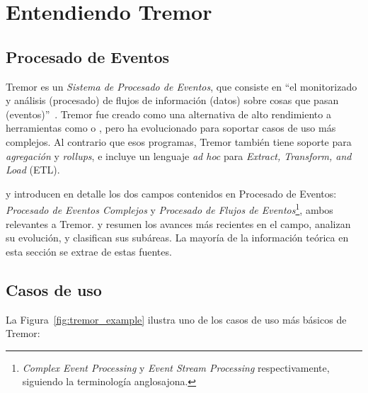 
\chapter{Entendiendo Tremor}\label{ch:tremor}

\section{Procesado de Eventos}

Tremor es un \emph{Sistema de Procesado de Eventos}, que consiste en ``el
monitorizado y análisis (procesado) de flujos de información (datos) sobre cosas
que pasan (eventos)''~\cite{luckham2011event}. Tremor fue creado como una
alternativa de alto rendimiento a herramientas como \textcite{logstash} o
\textcite{telegraf}, pero ha evolucionado para soportar casos de uso más
complejos. Al contrario que esos programas, Tremor también tiene soporte para
\emph{agregación} y \emph{rollups}, e incluye un lenguaje \emph{ad hoc} para
\emph{Extract, Transform, and Load} (ETL).

\textcite{robins2010complex} y \textcite{cugola2012processing} introducen en
detalle los dos campos contenidos en Procesado de Eventos: \emph{Procesado de
Eventos Complejos} y \emph{Procesado de Flujos de
Eventos}\footnote{\emph{Complex Event Processing} y \emph{Event Stream
Processing} respectivamente, siguiendo la terminología anglosajona.}, ambos
relevantes a Tremor. \textcite{dayarathna2018recent} y
\textcite{tawsif2018review} resumen los avances más recientes en el campo,
analizan su evolución, y clasifican sus subáreas. La mayoría de la información
teórica en esta sección se extrae de estas fuentes.

\section{Casos de uso}

La Figura~\ref{fig:tremor_example} ilustra uno de los casos de uso más básicos
de Tremor:

